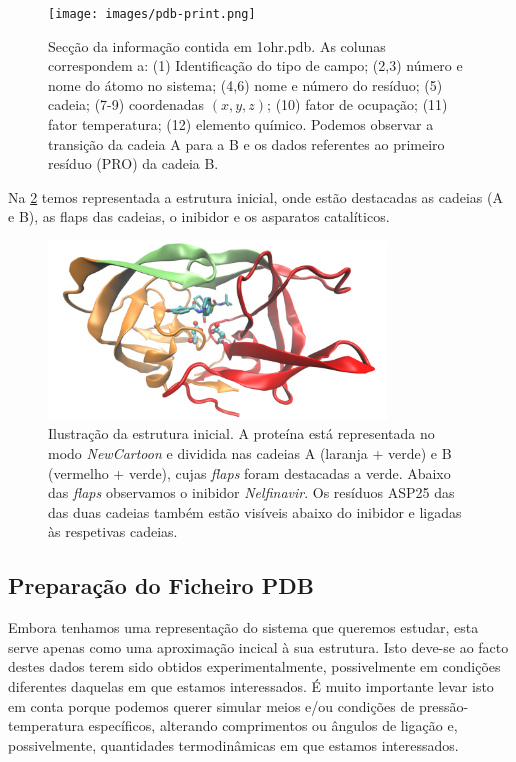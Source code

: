 \documentclass[12pt,a4paper]{article}
\begin{document}
	\begin{figure}[h]
		\centering
		\texttt{[image: images/pdb-print.png]}
		\caption{Secção da informação contida em 1ohr.pdb. As colunas correspondem a: (1) Identificação do tipo de campo; (2,3) número e nome do átomo no sistema; (4,6) nome e número do resíduo; (5) cadeia; (7-9) coordenadas $(x,y,z)$; (10) fator de ocupação; (11) fator temperatura; (12) elemento químico. Podemos observar a transição da cadeia A para a B e os dados referentes ao primeiro resíduo (PRO) da cadeia B.}%
		\label{fig:vis:pdb-print}
	\end{figure}
	
	Na \cref{fig:vis:original-pdb} temos representada a estrutura inicial, onde estão destacadas as cadeias (A e B), as flaps das cadeias, o inibidor e os asparatos catalíticos.

	\begin{figure}[h]
		\centering
		\includegraphics[width=0.8\textwidth]{images/1ohr-chains.pdf}
		\caption{Ilustração da estrutura inicial. A proteína está representada no modo \textit{NewCartoon} e dividida nas cadeias A (laranja + verde) e B (vermelho + verde), cujas \textit{flaps} foram destacadas a verde. Abaixo das \textit{flaps} observamos o inibidor \textit{Nelfinavir}. Os resíduos ASP25 das das duas cadeias também estão visíveis abaixo do inibidor e ligadas às respetivas cadeias.}
		\label{fig:vis:original-pdb}
	\end{figure}

\subsection{Preparação do Ficheiro PDB}

	Embora tenhamos uma representação do sistema que queremos estudar, esta serve apenas como uma aproximação incical à sua estrutura. Isto deve-se ao facto destes dados terem sido obtidos experimentalmente, possivelmente em condições diferentes daquelas em que estamos interessados. É muito importante levar isto em conta porque podemos querer simular meios e/ou condições de pressão-temperatura específicos, alterando comprimentos ou ângulos de ligação e, possivelmente, quantidades termodinâmicas em que estamos interessados.
	
\end{document}
